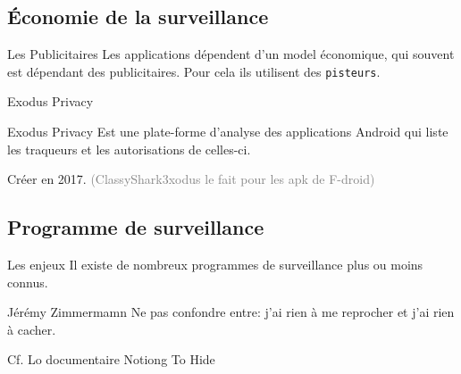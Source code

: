 \documentclass[aspectratio=169]{beamer}
\begin{document}
\subsection{Économie de la surveillance}

\begin{frame}
\begin{center}
\large{\color{cvp}{Économie de la surveillance}}
\end{center}
\end{frame}

\begin{frame}{Les Publicitaires}
Les applications dépendent d'un model économique, qui souvent est dépendant des publicitaires.\newline
\newline
Pour cela ils utilisent des \texttt{pisteurs}.
\end{frame}

\begin{frame}{Exodus Privacy}
\begin{block}{Exodus Privacy}
Est une plate-forme d'analyse des applications Android qui liste les traqueurs et les autorisations de celles-ci.
\end{block}
Créer en 2017.\newline
\newline
\newline
\textcolor{gray}{\tiny{(ClassyShark3xodus le fait pour les apk de F-droid)}}
\end{frame}

\subsection{Programme de surveillance}

\begin{frame}
\begin{center}
\large{\color{cvp}{Programme de surveillance}}
\end{center}
\end{frame}

\begin{frame}{Les enjeux}
Il existe de nombreux programmes de surveillance plus ou moins connus.
\begin{block}{Jérémy Zimmermamn}
Ne pas confondre entre: j'ai rien à me reprocher et j'ai rien à cacher.
\end{block}
Cf. Lo documentaire Notiong To Hide
\end{frame}
\end{document}

